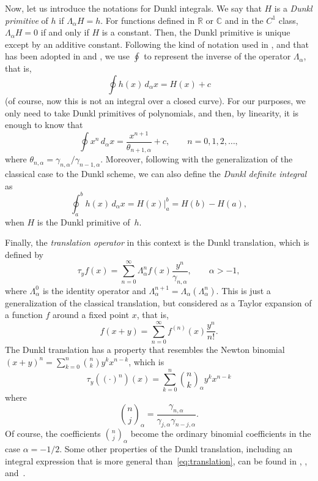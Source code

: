 \documentclass[11pt]{article}
\theoremstyle{plain}
\theoremstyle{remark}
\numberwithin{equation}{section} %
\newcommand{\La}{\Lambda_{\alpha}}
\newcommand{\binoma}[2]{\binom{#1}{#2}_{\!\alpha}}
\newcommand{\RR}{\mathbb{R}}
\newcommand{\CC}{\mathbb{C}}
\begin{document}
Now, let us introduce the notations for Dunkl integrals.
We say that $H$ is a \textit{Dunkl primitive} of $h$ if $\La H = h$. For functions defined in $\RR$ or $\CC$ and in the $C^1$ class, $\La H = 0$ if and only if $H$ is a constant. Then, the Dunkl primitive is unique except by an additive constant. Following the kind of notation used in \cite[\S\,15]{Cho}, and that has been adopted in \cite[\S\,5]{CMV} and \cite{JMC, GLMV}, we use $\oint$ to represent the inverse of the operator $\Lambda_\alpha$, that is,
\[
  \oint h(x)\,d_\alpha x = H(x) + c
\]
(of course, now this is not an integral over a closed curve).
For our purposes, we only need to take Dunkl primitives of polynomials, and then, by linearity, it is enough to know that
\begin{equation*}
  \oint x^n\,d_\alpha x = \frac{x^{n+1}}{\theta_{n+1,\alpha}} + c, \qquad n = 0,1,2,\dots,
\end{equation*} 
where $\theta_{n,\alpha} = \gamma_{n,\alpha}/\gamma_{n-1,\alpha}$.
Moreover, following with the generalization of the classical case to the Dunkl scheme, we can also define the \textit{Dunkl definite integral} as
\begin{equation}
\label{eq:primDxn}
  \oint_a^b h(x)\,d_\alpha x = H(x)\Big|_{a}^{b} = H(b)-H(a),
\end{equation}
when $H$ is the Dunkl primitive of~$h$.


Finally, the \textit{translation operator} in this context is the Dunkl translation, which is  defined by
\begin{equation}
\label{eq:translation}
  \tau_y f(x) = \sum_{n=0}^\infty \La^{n}f(x) \frac{y^n}{\gamma_{n,\alpha}},
  \qquad \alpha>-1,
\end{equation}
where $\La^0$ is the identity operator and $\La^{n+1} = \La(\La^n)$. 
This is just a generalization of the classical translation, but considered as a Taylor expansion of a function $f$ around a fixed point $x$, that is,
\[
  f(x+y) = \sum_{n=0}^\infty f^{(n)}(x) \frac{y^n}{n!}.
\]
The Dunkl translation has a property that resembles the Newton binomial $(x+y)^n = \sum_{k=0}^n \binom{n}{k} y^k x^{n-k}$, which is
\begin{equation*}
  \tau_y ((\cdot)^n)(x) = 
  \sum_{k=0}^n \binoma{n}{k} y^k x^{n-k}
\end{equation*}
where
\[
  \binoma{n}{j} = \frac{\gamma_{n,\alpha}}{\gamma_{j,\alpha}\gamma_{n-j,\alpha}}.
\]
Of course, the coefficients $\binoma{n}{j}$ become the ordinary binomial coefficients in the case $\alpha=-1/2$.
Some other properties of the Dunkl translation, including an integral expression that is more general than~\eqref{eq:translation}, can be found in \cite{Ros}, \cite{Rosler03}, and~\cite{ThX}.
\end{document}
